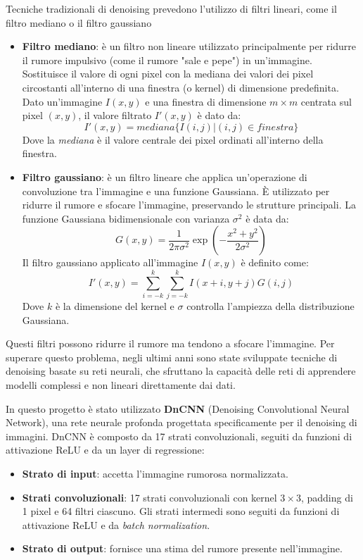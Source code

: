 Tecniche tradizionali di denoising prevedono l'utilizzo di filtri lineari, come il filtro mediano o il filtro gaussiano

\begin{itemize}
    \item \textbf{Filtro mediano}: è un filtro non lineare utilizzato principalmente per ridurre il rumore impulsivo (come il rumore "sale e pepe") in un'immagine. Sostituisce il valore di ogni pixel con la mediana dei valori dei pixel circostanti all'interno di una finestra (o kernel) di dimensione predefinita.
    Dato un'immagine $I(x,y)$ e una finestra di dimensione $m\times m$ centrata sul pixel $(x,y)$, il valore filtrato $I'(x,y)$ è dato da:
    $$
    I'(x,y)=mediana\{I(i,j)|(i,j) \in finestra\}
    $$
    Dove la \textit{mediana} è il valore centrale dei pixel ordinati all'interno della finestra.
    
    \item \textbf{Filtro gaussiano}: è un filtro lineare che applica un'operazione di convoluzione tra l'immagine e una funzione Gaussiana. È utilizzato per ridurre il rumore e sfocare l'immagine, preservando le strutture principali. La funzione Gaussiana bidimensionale con varianza $\sigma^2$ è data da:
    $$
    G(x,y)=\dfrac{1}{2\pi\sigma^2}\exp{\left(-\dfrac{x^2+y^2}{2\sigma^2}\right)}
    $$
    Il filtro gaussiano applicato all'immagine $I(x,y)$ è definito come:
    $$
    I'(x,y)=\sum_{i=-k}^{k}\sum_{j=-k}^{k}I(x+i,y+j)G(i,j)
    $$
    Dove $k$ è la dimensione del kernel e $\sigma$ controlla l'ampiezza della distribuzione Gaussiana.
\end{itemize}

Questi filtri possono ridurre il rumore ma tendono a sfocare l'immagine. Per superare questo problema, negli ultimi anni sono state sviluppate tecniche di denoising basate su reti neurali, che sfruttano la capacità delle reti di apprendere modelli complessi e non lineari direttamente dai dati.

In questo progetto è stato utilizzato \textbf{DnCNN} (Denoising Convolutional Neural Network), una rete neurale profonda progettata specificamente per il denoising di immagini. DnCNN è composto da 17 strati convoluzionali, seguiti da funzioni di attivazione ReLU e da un layer di regressione:

\begin{itemize} \item \textbf{Strato di input}: accetta l'immagine rumorosa normalizzata. \item \textbf{Strati convoluzionali}: 17 strati convoluzionali con kernel $3 \times 3$, padding di 1 pixel e 64 filtri ciascuno. Gli strati intermedi sono seguiti da funzioni di attivazione ReLU e da \textit{batch normalization}. \item \textbf{Strato di output}: fornisce una stima del rumore presente nell'immagine. \end{itemize}

